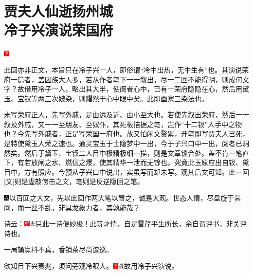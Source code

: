 

\chapter{贾夫人仙逝扬州城\\冷子兴演说荣国府}
\includegraphics[width=3mm]{../Images/00002}{\kaishu 此回亦非正文，本旨只在冷子兴一人，即俗谓``冷中出热，无中生有''也。其演说荣府一篇者，盖因族大人多，若从作者笔下一一叙出，尽一二回不能得明，则成何文字？故借用冷子一人，略出其大半，使阅者心中，已有一荣府隐隐在心，然后用黛玉、宝钗等两三次皴染，则耀然于心中眼中矣。此即画家三染法也。


未写荣府正人，先写外戚，是由远及近、由小至大也。若使先叙出荣府，然后一一叙及外戚，又一一至朋友、至奴仆，其死板拮据之笔，岂作``十二钗''人手中之物也？今先写外戚者，正是写荣国一府也。故又怕闲文赘累，开笔即写贾夫人已死，是特使黛玉入荣之速也。通灵宝玉于士隐梦中一出，今于子兴口中一出，阅者已洞然矣。然后于黛玉、宝钗二人目中极精极细一描，则是文章锁合处。盖不肯一笔直下，有若放闸之水、燃信之爆，使其精华一泄而无馀也。究竟此玉原应出自钗、黛目中，方有照应。今预从子兴口中说出，实虽写而却未写。观其后文可知。此一回{[}文{]}则是虚敲傍击之文，笔则是反逆隐回之笔。

\includegraphics[width=3mm]{../Images/00005}以百回之大文，先以此回作两大笔以冒之，诚是大观。世态人情，尽盘旋于其间，而一丝不乱，非具龙象力者，其孰能哉？}

诗云：{\includegraphics[width=3mm]{../Images/00002}\includegraphics[width=3mm]{../Images/00012}\footnotesize \kaishu 只此一诗便妙极！此等才情，自是雪芹平生所长，余自谓评书，非关评诗也。}

一局输赢料不真，香销茶尽尚逡巡。

欲知目下兴衰兆，须问旁观冷眼人。{\includegraphics[width=3mm]{../Images/00002}\includegraphics[width=3mm]{../Images/00010}\footnotesize \kaishu 故用冷子兴演说。}

